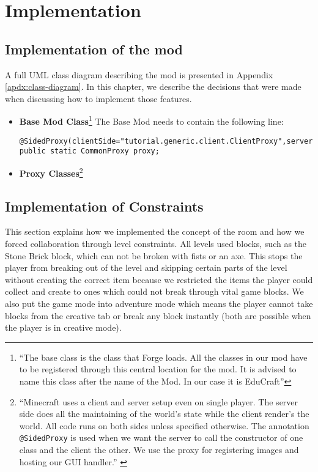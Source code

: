 \chapter{Implementation}
\label{ch:implementation}

\section{Implementation of the mod}
A full UML class diagram describing the mod is presented in Appendix
\ref{apdx:class-diagram}. In this chapter, we describe the decisions that
were made when discussing how to implement those features.

\begin{itemize}
\item \textbf{Base Mod Class}\footnote{``The base class is the class that Forge loads. All the classes in our mod have to be registered through this central location for the mod. It is advised to name this class after the name of the Mod. In our case it is EduCraft''\cite{website:forge-basemods}}\newline
The Base Mod needs to contain the following line:
\begin{lstlisting}
@SidedProxy(clientSide="tutorial.generic.client.ClientProxy",serverSide="tutorial.generic.CommonProxy")
public static CommonProxy proxy;
\end{lstlisting}

\item \textbf{Proxy Classes}\footnote{``Minecraft uses a client and server setup even on single player. The server side does all the maintaining of the world's state while the client render’s the world. All code runs on both sides unless specified otherwise.\newline
The annotation \texttt{@SidedProxy} is used when we want the server to call the constructor of one class and the client the other. We use the proxy for registering images and hosting our GUI handler.'' \cite{website:forge-proxy}}
\end{itemize}

\section{Implementation of Constraints}
This section explains how we implemented the concept of the room and how we forced collaboration through level constraints. All levels used blocks, such as the Stone Brick block, which can not be broken with fists or an axe. This stops the player from breaking out of the level and skipping certain parts of the level without creating the correct item because we restricted the items the player could collect and create to ones which could not break through vital game blocks. We also put the game mode into adventure mode which means the player cannot take blocks from the creative tab or break any block instantly (both are possible when the player is in creative mode).


